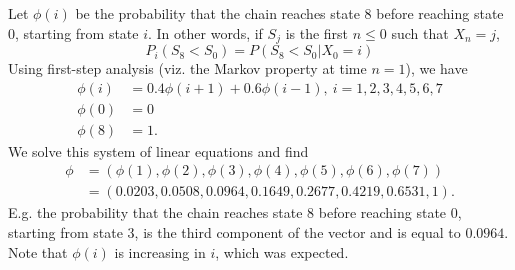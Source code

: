 \begin{enumerate}[label=\alph*)]
\begin{solution}[5cm]
Let $\phi(i)$ be the probability that the chain reaches state 8 before 
reaching state 0, starting from state $i$. In other words, if $S_j$ is 
the first $n \leq 0$ such that $X_n = j$, 
\begin{equation}
P_i(S_8 < S_0) = P(S_8 < S_0|X_0 = i)
\end{equation}
Using first-step analysis (viz. the Markov property at time $n = 1$), 
we have 
\begin{align*}
\phi(i) &= 0.4 \phi(i + 1) + 0.6 \phi(i - 1),\ i = 1, 2,3,4,5,6,7 \\
\phi(0) &= 0 \\
\phi(8) &= 1.
\end{align*}
We solve this system of linear equations and find
\begin{align*}
\phi &= (\phi(1), \phi(2), \phi(3), \phi(4), \phi(5), \phi(6), \phi(7)) \\
&= (0.0203, 0.0508, 0.0964, 0.1649, 0.2677, 0.4219, 0.6531, 1).
\end{align*}
E.g. the probability that the chain reaches state 8 before reaching 
state 0, starting from state 3, is the third component of the vector 
and is equal to $0.0964$. Note that $\phi(i)$ is increasing in $i$, 
which was expected.
\end{solution}


\end{enumerate}
